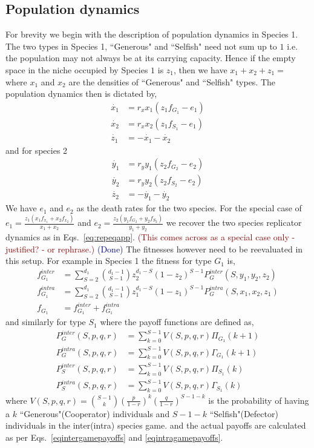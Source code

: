 \documentclass[12pt]{article}
\newcommand{\cha}[1]{\textcolor{darkblue}{(#1)}}
\newcommand{\marcus}[1]{\textcolor{darkred}{(#1)}}
\begin{document}
\begin{appendices}
\section{Population dynamics}

For brevity we begin with the description of population dynamics in Species 1.
The two types in Species 1, ``Generous" and ``Selfish" need not sum up to $1$ i.e. the population may not always be at its carrying capacity.
Hence if the empty space in the niche occupied by Species $1$ is $z_1$, then we have $x_1 + x_2 + z_1 = $ where $x_1$ and $x_2$ are the densities of ``Generous" and ``Selfish" types.
The population dynamics then is dictated by,
%
\begin{align}
	\dot{x_1} &= r_x x_1 (z_1 f_{G_1} - e_1) \nonumber \\
	\dot{x_2} &= r_x x_2 (z_1 f_{S_1} - e_1) \\
	\dot{z_1} &= - \dot{x_1} - \dot{x_2} \nonumber
\end{align}
%
and for species 2
\begin{align}
	\dot{y_1} &= r_y y_1 (z_2 f_{G_2} - e_2) \nonumber \\
	\dot{y_2} &= r_y y_2 (z_2 f_{S_2} - e_2) \\
	\dot{z_2} &= - \dot{y_1} - \dot{y_2} \nonumber
\end{align}
%
We have $e_1$ and $e_2$ as the death rates for the two species. For the special case of  $e_1 = \frac{z_1 (x_1 f_{x_1} + x_2 f_{x_2}) }{x_1 + x_2}$ and $e_2 = \frac{z_2 (y_1 f_{G_2} + y_2 f_{S_2}) }{y_1 + y_2}$ we recover the two species replicator dynamics as in Eqs.~\ref{eq:repeqapp}. 
\marcus{This comes across as a special case only - justified? - or rephrase.}
\cha{Done}
The fitnesses however need to be reevaluated in this setup.
For example in Species 1 the fitness for type $G_1$ is,
%
\begin{align}
	f_{G_1}^{inter} &= \sum_{S=2}^{d_1} \binom{d_1 -1}{S-1} z_2 ^{d_1 -S} (1-z_2)^{S-1} P_G^{inter}(S,y_1,y_2,z_2) \nonumber \\
	f_{G_1}^{intra} &= \sum_{S=2}^{d_1} \binom{d_1 -1}{S-1} z_1 ^{d_1 -S} (1-z_1)^{S-1} P_G^{intra}(S,x_1,x_2,z_1) \\
	f_{G_1} &= f_{G_1}^{inter} + f_{G_1}^{intra}
\end{align}
%
and similarly for type $S_1$ where the payoff functions are defined as,
%
\begin{align}
	P_G^{inter}(S,p,q,r) &= \sum_{k=0}^{S-1} V(S,p,q,r) \Pi_{G_1}(k+1) \\
	P_G^{intra}(S,p,q,r) &= \sum_{k=0}^{S-1} V(S,p,q,r) \Gamma_{G_1}(k+1) \\
	P_S^{inter}(S,p,q,r) &= \sum_{k=0}^{S-1} V(S,p,q,r) \Pi_{S_1}(k) \\
	P_S^{intra}(S,p,q,r) &= \sum_{k=0}^{S-1} V(S,p,q,r) \Gamma_{S_1}(k)
\end{align}
%
where $V(S,p,q,r) = \binom{S-1}{k} \left( \frac{p}{1-r}\right)^k  \left(\frac{q}{1-r}\right)^{S-1-k}$ is the probability of having a $k$ ``Generous"(Cooperator) individuals and $S-1-k$ ``Selfish"(Defector) individuals in the inter(intra) species game.
and the actual payoffs are calculated as per Eqs.~\ref{eqintergamepayoffs} and \ref{eqintragamepayoffs}.

\end{appendices}
\end{document}
